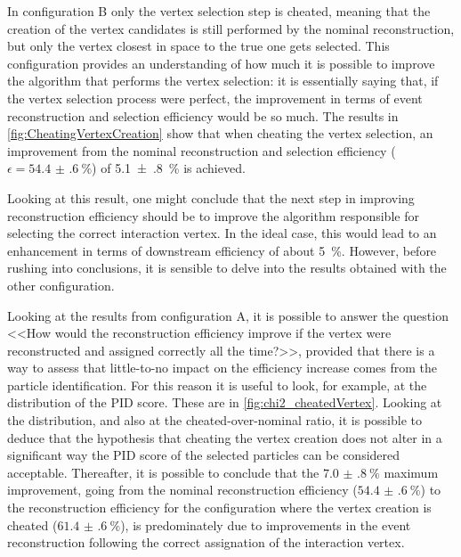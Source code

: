In configuration B only the vertex selection step is cheated, meaning that the creation of the vertex candidates is still performed by the nominal reconstruction, but only the vertex closest in space to the true one gets selected. This configuration provides an understanding of how much it is possible to improve the algorithm that performs the vertex selection: it is essentially saying that, if the vertex selection process were perfect, the improvement in terms of event reconstruction and selection efficiency would be so much. The results in \autoref{fig:CheatingVertexCreation} show that when cheating the vertex selection, an improvement from the nominal reconstruction and selection efficiency ($\epsilon = \SI{54.4(6)}{\percent}$) of \SI{5.1(8)}{\percent} is achieved. 

Looking at this result, one might conclude that the next step in improving reconstruction efficiency should be to improve the algorithm responsible for selecting the correct interaction vertex. In the ideal case, this would lead to an enhancement in terms of downstream efficiency of about \SI{5}{\percent}. However, before rushing into conclusions, it is sensible to delve into the results obtained with the other configuration. 

Looking at the results from configuration A, it is possible to answer the question <<How would the reconstruction efficiency improve if the vertex were reconstructed and assigned correctly all the time?>>, provided that there is a way to assess that little-to-no impact on the efficiency increase comes from the particle identification. For this reason it  is useful to look, for example, at the distribution of the PID score. These are in \autoref{fig:chi2_cheatedVertex}. Looking at the distribution, and also at the cheated-over-nominal ratio, it is possible to deduce that the hypothesis that cheating the vertex creation does not alter in a significant way the PID score of the selected particles can be considered acceptable. Thereafter, it is possible to conclude that the $\SI{7.0(8)}{\percent}$ maximum improvement, going from the nominal reconstruction efficiency ($\SI{54.4(6)}{\percent}$) to the reconstruction efficiency for the configuration where the vertex creation is cheated ($\SI{61.4(6)}{\percent}$), is predominately due to improvements in the event reconstruction following the correct assignation of the interaction vertex. 

